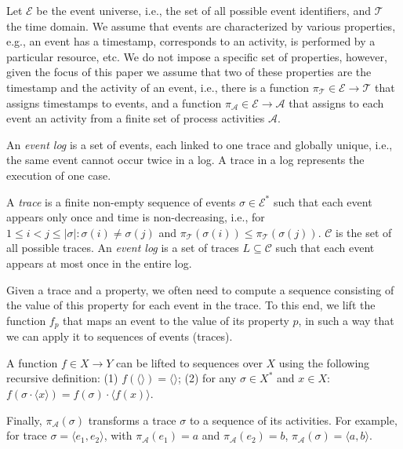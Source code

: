 \documentclass[runningheads,a4paper]{llncs}
\begin{document}
Let $\mathcal{E}$ be the event universe, i.e., the set of all possible event identifiers, and $\mathcal{T}$ the time domain. We assume that events are characterized by various properties, e.g., an event has a timestamp, corresponds to an activity, is performed by a particular resource, etc. We do not impose a specific set of properties, however, given the focus of this paper we assume that two of these properties are the timestamp and the activity of an event, i.e., there is a function $\pi_\mathcal{T}\in \mathcal{E}\rightarrow\mathcal{T}$ that assigns timestamps to events, and a function $\pi_\mathcal{A}\in\mathcal{E}\rightarrow\mathcal{A}$ that assigns to each event an activity from a finite set of process activities $\mathcal{A}$.

An \emph{event log} is a set of events, each linked to one trace and globally unique, i.e., the same event cannot occur twice in a log. A trace in a log represents the execution of one case.

\begin{definition}
	A \emph{trace} is a finite non-empty sequence of events $\sigma\in\mathcal{E}^*$ such that each event appears only once and time is non-decreasing, i.e., for $1\le i < j \le |\sigma|:\sigma(i)\neq\sigma(j)$ and $\pi_\mathcal{T}(\sigma(i))\le\pi_\mathcal{T}(\sigma(j))$. $\mathcal{C}$ is the set of all possible traces. An \emph{event log} is a set of traces $L\subseteq\mathcal{C}$ such that each event appears at most once in the entire log.
\end{definition}

Given a trace and a property, we often need to compute a sequence consisting of the value of this property for each event in the trace. To this end, we lift the function $f_p$ that maps an event to the value of its property $p$, in such a way that we can apply it to sequences of events (traces).



\begin{definition}
	\label{def:funtoseq}
	A function $f \in X \rightarrow Y$ can be lifted to sequences over $X$ using the following recursive definition: (1) $f(\langle\rangle)=\langle\rangle$;  (2) for any $\sigma\in X^*$ and $x\in X$: $f(\sigma \cdot \langle x\rangle) = f(\sigma) \cdot \langle f(x)\rangle$.

\end{definition}

Finally, $\pi_\mathcal{A}(\sigma)$ transforms a trace $\sigma$ to a sequence of its activities. For example, for trace $\sigma=\langle e_1, e_2\rangle$, with $\pi_\mathcal{A}(e_1)=a$ and $\pi_\mathcal{A}(e_2)=b$, $\pi_\mathcal{A}(\sigma)=\langle a,b\rangle$.
\end{document}
